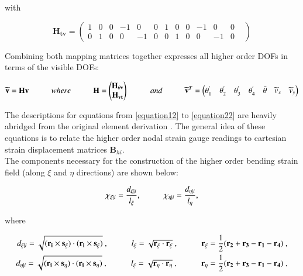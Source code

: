 with

\begin{equation} 
\mathbf{H_{tv}} =
\begin{pmatrix}
1 & 0 & 0 & -1 & 0 & 0 & 1 & 0 & 0 & -1 & 0 & 0 \\
0 & 1 & 0 & 0 & -1 & 0 & 0 & 1 & 0 & 0 & -1 & 0 & 
\end{pmatrix}
\label{equation10}
\end{equation}

Combining both mapping matrices together expresses all higher order DOFs in terms of the visible DOFs:

\begin{equation} 
\widetilde{\mathbf{v}} = \mathbf{H v}
\hspace{10mm}
where
\hspace{10mm}
\mathbf{H} =
\begin{pmatrix}
\mathbf{H_{\theta v}} \\
\mathbf{H_{vt}}
\end{pmatrix}
\hspace{10mm}
and
\hspace{10mm}
\widetilde{\mathbf{v}}^T = 
\begin{pmatrix}
\theta_1^{'} & \theta_2^{'} & \theta_3^{'} & \theta_4^{'} & \bar{\theta} &  \widetilde{v}_x & \widetilde{v}_y
\end{pmatrix}
\label{equation11}
\end{equation}

The descriptions for equations from \eqref{equation12} to \eqref{equation22} are heavily abridged from the original element derivation \cite{Hau94}. The general idea of these equations is to relate the higher order nodal strain gauge readings to cartesian strain displacement matrices $\mathbf{B}_{hi}$.\\

The components necessary for the construction of the higher order bending strain field (along $\xi$ and $\eta$ directions) are shown below:

\begin{equation} 
\chi_{\xi | i} = \frac{d_{\xi | i}}{l_\xi},
\hspace{10mm}
\chi_{\eta | i} = \frac{d_{\eta | i}}{l_\eta},
\label{equation12}
\end{equation}

where

\begin{align*} 
	d_{\xi | i} = \sqrt{(\mathbf{r_i} \times \mathbf{s_\xi}) \cdot (\mathbf{r_i} \times \mathbf{s_\xi})}\ ,
	\hspace{10mm}
	l_\xi = \sqrt{\mathbf{r_\xi} \cdot \mathbf{r_\xi}}\ ,
	\hspace{10mm} 
	\mathbf{r_\xi} = \frac{1}{2} ( \mathbf{r_2} + \mathbf{r_3} - \mathbf{r_1} - \mathbf{r_4} )\ , \\
	d_{\eta | i} = \sqrt{(\mathbf{r_i} \times \mathbf{s_\eta}) \cdot (\mathbf{r_i} \times \mathbf{s_\eta})}\ ,
	\hspace{10mm}
	l_\xi = \sqrt{\mathbf{r_\eta} \cdot \mathbf{r_\eta}}\ ,
	\hspace{10mm}
	\mathbf{r_\eta} = \frac{1}{2} ( \mathbf{r_2} + \mathbf{r_3} - \mathbf{r_1} - \mathbf{r_4} )\ ,
\end{align*}


